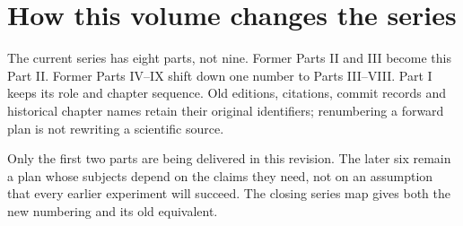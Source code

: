 \chapter*{How this volume changes the series}
The current series has eight parts, not nine. Former Parts II and III become
this Part II. Former Parts IV--IX shift down one number to Parts III--VIII.
Part I keeps its role and chapter sequence. Old editions, citations, commit
records and historical chapter names retain their original identifiers;
renumbering a forward plan is not rewriting a scientific source.

Only the first two parts are being delivered in this revision. The later
six remain a plan whose subjects depend on the claims they need, not on an
assumption that every earlier experiment will succeed. The closing series
map gives both the new numbering and its old equivalent.
